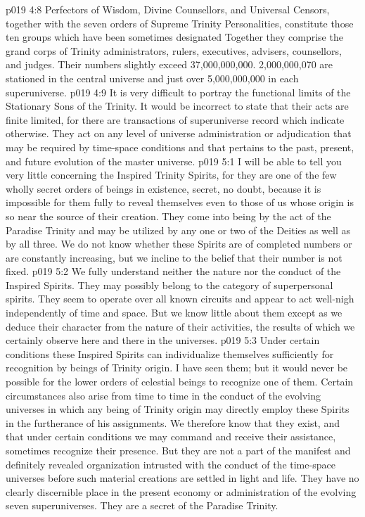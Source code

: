 \vs p019 4:8 \pc Perfectors of Wisdom, Divine Counsellors, and Universal Censors, together with the seven orders of Supreme Trinity Personalities, constitute those ten groups which have been sometimes designated  Together they comprise the grand corps of Trinity administrators, rulers, executives, advisers, counsellors, and judges. Their numbers slightly exceed 37,000,000,000. 2,000,000,070 are stationed in the central universe and just over 5,000,000,000 in each superuniverse.
\vs p019 4:9 It is very difficult to portray the functional limits of the Stationary Sons of the Trinity. It would be incorrect to state that their acts are finite limited, for there are transactions of superuniverse record which indicate otherwise. They act on any level of universe administration or adjudication that may be required by time\hyp{}space conditions and that pertains to the past, present, and future evolution of the master universe.
\vs p019 5:1 I will be able to tell you very little concerning the Inspired Trinity Spirits, for they are one of the few wholly secret orders of beings in existence, secret, no doubt, because it is impossible for them fully to reveal themselves even to those of us whose origin is so near the source of their creation. They come into being by the act of the Paradise Trinity and may be utilized by any one or two of the Deities as well as by all three. We do not know whether these Spirits are of completed numbers or are constantly increasing, but we incline to the belief that their number is not fixed.
\vs p019 5:2 We fully understand neither the nature nor the conduct of the Inspired Spirits. They may possibly belong to the category of superpersonal spirits. They seem to operate over all known circuits and appear to act well\hyp{}nigh independently of time and space. But we know little about them except as we deduce their character from the nature of their activities, the results of which we certainly observe here and there in the universes.
\vs p019 5:3 Under certain conditions these Inspired Spirits can individualize themselves sufficiently for recognition by beings of Trinity origin. I have seen them; but it would never be possible for the lower orders of celestial beings to recognize one of them. Certain circumstances also arise from time to time in the conduct of the evolving universes in which any being of Trinity origin may directly employ these Spirits in the furtherance of his assignments. We therefore know that they exist, and that under certain conditions we may command and receive their assistance, sometimes recognize their presence. But they are not a part of the manifest and definitely revealed organization intrusted with the conduct of the time\hyp{}space universes before such material creations are settled in light and life. They have no clearly discernible place in the present economy or administration of the evolving seven superuniverses. They are a secret of the Paradise Trinity.
